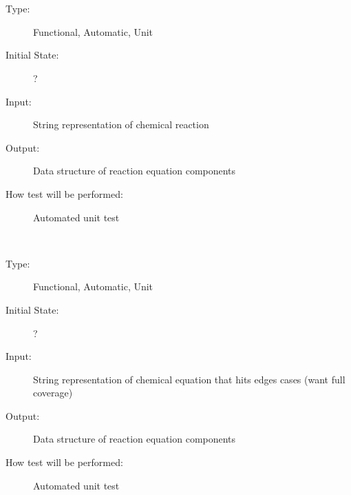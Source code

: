 \documentclass[12pt, titlepage]{article}
\newcounter{testnum} %
\begin{document}
\\
\begin{addmargin}[2em]{0em}
\\
\begin{addmargin}[2em]{0em}
\begin{description}
\item[Type:] Functional, Automatic, Unit
					
\item[Initial State:] ?
					
\item[Input:] String representation of chemical reaction
					
\item[Output:] Data structure of reaction equation components
					
\item[How test will be performed:] Automated unit test \\
\end{description}
\end{addmargin}			
\\
\begin{addmargin}[2em]{0em}
\begin{description}
\item[Type:] Functional, Automatic, Unit
					
\item[Initial State:] ?
					
\item[Input:] String representation of chemical equation that hits edges cases 
  (want full coverage)
					
\item[Output:] Data structure of reaction equation components
					
\item[How test will be performed:] Automated unit test\\
\end{description}
\end{addmargin}
\noindent {}\\


\end{addmargin}
\end{document}
